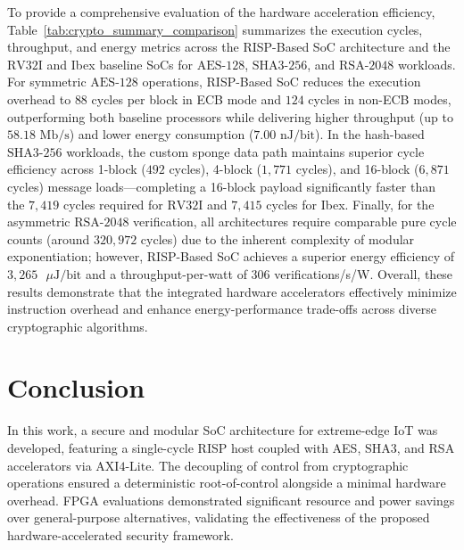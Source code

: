To provide a comprehensive evaluation of the hardware acceleration efficiency, Table~\ref{tab:crypto_summary_comparison} summarizes the execution cycles, throughput, and energy metrics across the RISP-Based SoC architecture and the $\text{RV}32\text{I}$ and Ibex baseline SoCs for $\text{AES}\text{-}128$, $\text{SHA}3\text{-}256$, and $\text{RSA}\text{-}2048$ workloads. For symmetric $\text{AES}\text{-}128$ operations, RISP-Based SoC reduces the execution overhead to $88$ cycles per block in ECB mode and $124$ cycles in non-ECB modes, outperforming both baseline processors while delivering higher throughput (up to $58.18 \text{ Mb/s}$) and lower energy consumption ($7.00 \text{ nJ/bit}$). In the hash-based $\text{SHA}3\text{-}256$ workloads, the custom sponge data path maintains superior cycle efficiency across 1-block ($492$ cycles), 4-block ($1,771$ cycles), and 16-block ($6,871$ cycles) message loads—completing a 16-block payload significantly faster than the $7,419$ cycles required for $\text{RV}32\text{I}$ and $7,415$ cycles for Ibex. Finally, for the asymmetric $\text{RSA}\text{-}2048$ verification, all architectures require comparable pure cycle counts (around $320,972$ cycles) due to the inherent complexity of modular exponentiation; however, RISP-Based SoC achieves a superior energy efficiency of $3,265 \text{ }\mu\text{J/bit}$ and a throughput-per-watt of $306$ verifications/s/W. Overall, these results demonstrate that the integrated hardware accelerators effectively minimize instruction overhead and enhance energy-performance trade-offs across diverse cryptographic algorithms.

\section{Conclusion}
\label{sec:Conclusion}

In this work, a secure and modular SoC architecture for extreme-edge IoT was developed, featuring a single-cycle RISP host coupled with AES, $\text{SHA}3$, and RSA accelerators via $\text{AXI}4\text{-}\text{Lite}$. The decoupling of control from cryptographic operations ensured a deterministic root-of-control alongside a minimal hardware overhead. FPGA evaluations demonstrated significant resource and power savings over general-purpose alternatives, validating the effectiveness of the proposed hardware-accelerated security framework.





